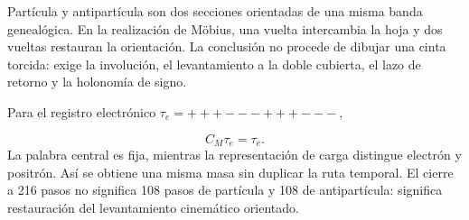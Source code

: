Partícula y antipartícula son dos secciones orientadas de una misma banda genealógica. En la realización de Möbius, una vuelta intercambia la hoja y dos vueltas restauran la orientación. La conclusión no procede de dibujar una cinta torcida: exige la involución, el levantamiento a la doble cubierta, el lazo de retorno y la holonomía de signo.

Para el registro electrónico \(\tau_e=+++---+++---\),

\[
C_M\tau_e=\tau_e.
\]
La palabra central es fija, mientras la representación de carga distingue electrón y positrón. Así se obtiene una misma masa sin duplicar la ruta temporal. El cierre a 216 pasos no significa 108 pasos de partícula y 108 de antipartícula: significa restauración del levantamiento cinemático orientado.

